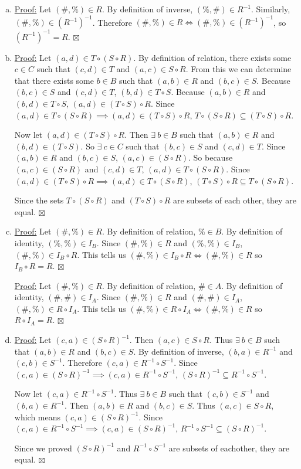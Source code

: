 \documentclass[a4paper,12pt]{article}
\newcommand{\sig}{$\boxtimes$}
\begin{document}
{
\begin{enumerate}[(a)]
\item
\underline{Proof:} Let $(\#, \%) \in R$. By definition of inverse, $(\%, \#) \in R^{-1}$. Similarly, $(\#, \%) \in (R^{-1})^{-1}$. Therefore  $(\#, \%) \in R \iff (\#, \%) \in (R^{-1})^{-1}$, so $(R^{-1})^{-1} = R$. \sig
\item
\underline{Proof:} Let $(a, d) \in T \circ (S \circ R)$. By definition of relation, there exists some $c \in C$ such that $(c, d) \in T$ and $(a, c) \in  S \circ R$. From this we can determine that there exists some $b \in B$ such that $(a, b) \in R$ and $(b, c) \in S$.  Because $(b, c) \in S$ and $(c, d) \in T$, $(b, d) \in  T \circ S$. Because $(a, b) \in R$ and $(b, d) \in T \circ S$, $(a, d) \in (T \circ S) \circ R$. Since $(a, d) \in T \circ (S \circ R) \implies (a, d) \in (T \circ S) \circ R$,  $T \circ (S \circ R) \subseteq (T \circ S) \circ R$. 

Now let $(a, d) \in (T \circ S) \circ R$. Then $\exists~b \in B$ such that $(a, b) \in R$ and $(b, d) \in (T \circ S)$. So $\exists~c \in C$ such that $(b, c) \in S$ and $(c, d) \in T$. Since $(a, b) \in R$ and $(b, c) \in S$, $(a, c) \in (S \circ R)$. So because $(a, c) \in (S \circ R)$ and $(c, d) \in T$, $(a, d) \in T \circ (S \circ R)$. Since $(a, d) \in (T \circ S) \circ R \implies (a, d) \in T \circ (S \circ R)$, $(T \circ S) \circ R \subseteq T \circ (S \circ R)$.

Since the sets $T \circ (S \circ R)$ and $(T \circ S) \circ R$ are subsets of each other, they are equal. \sig
\item
\underline{Proof:} Let $(\#, \%) \in R$. By definition of relation, $\% \in B$. By definition of identity, $(\%, \%) \in I_B$. Since $(\#, \%) \in R$ and $(\%, \%) \in I_B$, $(\#, \%) \in I_B \circ R$. This tells us $(\#, \%) \in I_B \circ R \iff (\#, \%) \in R$ so  $I_B \circ R = R$. \sig

\underline{Proof:} Let $(\#, \%) \in R$. By definition of relation, $\# \in A$. By definition of identity, $(\#, \#) \in I_A$. Since $(\#, \%) \in R$ and $(\#, \#) \in I_A$, $(\#, \%) \in R \circ I_A$. This tells us $(\#, \%) \in R \circ I_A \iff (\#, \%) \in R$ so  $R \circ I_A = R$. \sig
\item
\underline{Proof:} Let $(c, a) \in (S \circ R)^{-1}$. Then $(a, c) \in  S \circ R$. Thus $\exists~b \in B$ such that $(a, b) \in R$ and $(b, c) \in S$. By definition of inverse, $(b, a) \in R^{-1}$ and $(c, b) \in S^{-1}$. Therefore $(c, a) \in R^{-1}\circ S^{-1}$. Since $(c, a) \in (S \circ R)^{-1} \implies (c, a) \in R^{-1} \circ S^{-1}$, $(S \circ R)^{-1} \subseteq R^{-1} \circ S^{-1}$. 

Now let $(c, a) \in R^{-1}\circ S^{-1}$. Thus $\exists~b \in B$ such that $(c, b) \in S^{-1}$ and $(b, a) \in R^{-1}$. Then $(a, b) \in R$ and $(b, c) \in S$. Thus $(a, c) \in S \circ R$, which means $(c, a) \in (S \circ R)^{-1}$. Since $(c, a) \in R^{-1}\circ S^{-1} \implies (c, a) \in (S \circ R)^{-1}$, $R^{-1}\circ S^{-1} \subseteq (S \circ R)^{-1}$.

Since we proved $(S \circ R)^{-1}$ and $R^{-1} \circ S^{-1}$ are subsets of eachother, they are equal. \sig
\end{enumerate}
}
\end{document}
